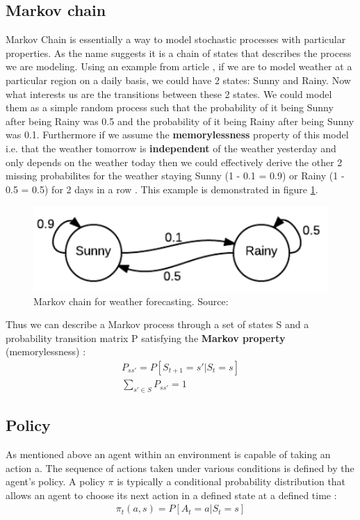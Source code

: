 \subsection{Markov chain}
Markov Chain is essentially a way to model stochastic
processes with particular properties. As the name suggests it is a chain of states that describes the process we are modeling. Using an example from article \cite{markov_chain_article}, if we
are to model weather at a particular region on a daily basis,
we could have 2 states: Sunny and Rainy. Now what interests us
are the transitions between these 2 states. We could model
them as a simple random process such that the probability of
it being Sunny after being Rainy was 0.5 and the probability
of it being Rainy after being Sunny was 0.1. Furthermore if we
assume the \textbf{memorylessness} property of this model i.e.
that the weather tomorrow is \textbf{independent} of the
weather yesterday and only depends on the weather today then
we could effectively derive the other 2 missing probabilites
for the weather staying Sunny (1 - 0.1 = 0.9) or Rainy (1 -
0.5 = 0.5) for 2 days in a row \cite{markov_chain_article}. This example is demonstrated in figure \ref{fig:weather}.

\begin{figure}[H]
  \centering
  \includegraphics[scale=0.7]{figures/markov_weather.PNG}
  \caption{Markov chain for weather forecasting. Source: \cite{markov_chain_article}}
  \label{fig:weather}
\end{figure}

Thus we can describe a Markov process through a set of states S and a probability transition matrix P satisfying the \textbf{Markov property} (memorylessness) \cite{markov_chain_article}:
\begin{align}
    P_{ss'} = P[S_{t+1} = s' | S_{t} = s]\\
    \sum_{s' \in S} P_{ss'} = 1
\end{align}

\subsection{Policy}
As mentioned above an agent within an environment is capable of taking an action a. The sequence of actions taken under 
various conditions is defined by the agent's policy.
A policy $\pi$ is typically a conditional probability distribution that allows an agent to choose its next action in a defined state at a defined time \cite{lecture_lets_go_markov}:
\begin{align}
    \pi_t(a, s) = P[A_t = a | S_t = s]
\end{align}

